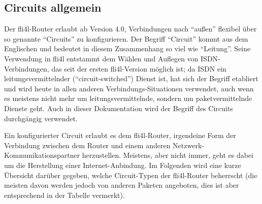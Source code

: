 
\newcommand{\circstatetrans}[2]{\emph{#1} $\rightarrow$ \emph{#2}}
\newcommand{\dialmodetrans}[2]{\emph{#1} $\rightarrow$ \emph{#2}}

\subsection{Circuits allgemein}\label{sec:circuits:general}

Der fli4l-Router erlaubt ab Version 4.0, Verbindungen nach ``außen'' flexibel
über so genannte ``Circuits'' zu konfigurieren. Der Begriff ``Circuit'' kommt
aus dem Englischen und bedeutet in diesem Zusammenhang so viel wie ``Leitung''.
Seine Verwendung in fli4l entstammt dem Wählen und Auflegen von
ISDN-Verbindungen, das seit der ersten fli4l-Version möglich ist; da ISDN
ein leitungsvermittelnder (``circuit-switched'') Dienst ist, hat sich der
Begriff etabliert und wird heute in allen anderen Verbindungs-Situationen
verwendet, auch wenn es meistens nicht mehr um leitungsvermittelnde, sondern um
paketvermittelnde Dienste geht. Auch in dieser Dokumentation wird der Begriff
des Circuits durchgängig verwendet.

Ein konfigurierter Circuit erlaubt es dem fli4l-Router, irgendeine Form der
Verbindung zwischen dem Router und einem anderen Netzwerk-Kommunikationspartner
herzustellen. Meistens, aber nicht immer, geht es dabei um die Herstellung
einer Internet-Anbindung. Im Folgenden wird eine kurze Übersicht darüber
gegeben, welche Circuit-Typen der fli4l-Router beherrscht (die meisten davon
werden jedoch von anderen Paketen angeboten, dies ist aber entsprechend in der
Tabelle vermerkt).

